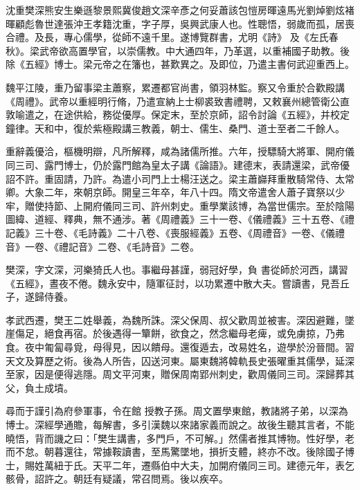 
\begin{pinyinscope}

 沈重樊深熊安生樂遜黎景熙冀俊趙文深辛彥之何妥蕭該包愷房暉遠馬光劉焯劉炫褚暉顧彪魯世達張沖王孝籍沈重，字子厚，吳興武康人也。性聰悟，弱歲而孤，居喪合禮。及長，專心儒學，從師不遠千里。遂博覽群書，尤明《詩》
 及《左氏春秋》。梁武帝欲高置學官，以崇儒教。中大通四年，乃革選，以重補國子助教。後除《五經》博士。梁元帝之在籓也，甚歎異之。及即位，乃遣主書何武迎重西上。



 魏平江陵，重乃留事梁主蕭察，累遷都官尚書，領羽林監。察又令重於合歡殿講《周禮》。武帝以重經明行脩，乃遣宣納上士柳裘致書禮聘，又敕襄州總管衛公直敦喻遣之，在途供給，務從優厚。保定末，至於京師，詔令討論《五經》，并校定鐘律。天和中，復於紫極殿講三教義，朝士、儒生、桑門、道士至者二千餘人。



 重辭義優洽，樞機明辯，凡所解釋，咸為諸儒所推。六年，授驃騎大將軍、開府儀
 同三司、露門博士，仍於露門館為皇太子講《論語》。建德末，表請還梁，武帝優詔不許。重固請，乃許。為遣小司門上士楊汪送之。梁主蕭巋拜重散騎常侍、太常卿。大象二年，來朝京師。開皇三年卒，年八十四。隋文帝遣舍人蕭子寶祭以少牢，贈使持節、上開府儀同三司、許州刺史。重學業該博，為當世儒宗。至於陰陽圖緯、道經、釋典，無不通涉。著《周禮義》三十一卷、《儀禮義》三十五卷、《禮記義》三十卷、《毛詩義》二十八卷、《喪服經義》五卷、《周禮音》一卷、《儀禮音》一卷、《禮記音》二卷、《毛詩音》二卷。



 樊深，字文深，河樂猗氏人也。事繼母甚謹，弱冠好學，負
 書從師於河西，講習《五經》，晝夜不倦。魏永安中，隨軍征討，以功累遷中散大夫。嘗讀書，見吾丘子，遂歸侍養。



 孝武西遷，樊王二姓舉義，為魏所誅。深父保周、叔父歡周並被害。深因避難，墜崖傷足，絕食再宿。於後遇得一簞餅，欲食之，然念繼母老痺，或免虜掠，乃弗食。夜中匍匐尋覓，母得見，因以饋母。還復遁去，改易姓名，遊學於汾晉間。習天文及算歷之術。後為人所告，囚送河東。屬東魏將韓軌長史張曜重其儒學，延深至家，因是便得逃隱。周文平河東，贈保周南郢州刺史，歡周儀同三司。深歸葬其父，負土成墳。



 尋而于謹引為府參軍事，令在館
 授教子孫。周文置學東館，教諸將子弟，以深為博士。深經學通贍，每解書，多引漢魏以來諸家義而說之。故後生聽其言者，不能曉悟，背而譏之曰：「樊生講書，多門戶，不可解。」然儒者推其博物。性好學，老而不怠。朝暮還往，常據鞍讀書，至馬驚墜地，損折支體，終亦不改。後除國子博士，賜姓萬紐于氏。天平二年，遷縣伯中大夫，加開府儀同三司。建德元年，表乞骸骨，詔許之。朝廷有疑議，常召問焉。後以疾卒。




\end{pinyinscope}
